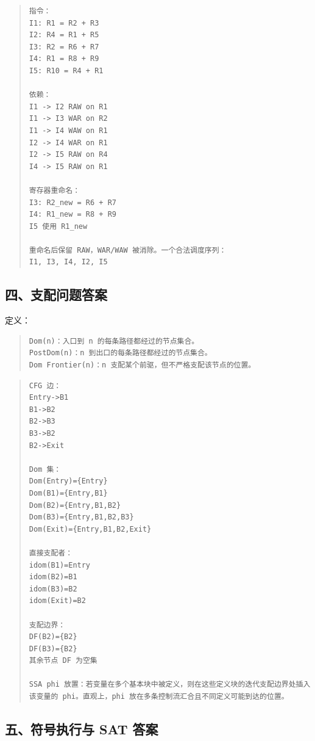 \documentclass[UTF8,zihao=-4]{ctexart}
\begin{document}
\begin{quote}
\footnotesize
\begin{verbatim}
指令：
I1: R1 = R2 + R3
I2: R4 = R1 + R5
I3: R2 = R6 + R7
I4: R1 = R8 + R9
I5: R10 = R4 + R1

依赖：
I1 -> I2 RAW on R1
I1 -> I3 WAR on R2
I1 -> I4 WAW on R1
I2 -> I4 WAR on R1
I2 -> I5 RAW on R4
I4 -> I5 RAW on R1

寄存器重命名：
I3: R2_new = R6 + R7
I4: R1_new = R8 + R9
I5 使用 R1_new

重命名后保留 RAW，WAR/WAW 被消除。一个合法调度序列：
I1, I3, I4, I2, I5
\end{verbatim}
\end{quote}



\subsection{四、支配问题答案}


定义：


\begin{quote}
\footnotesize
\begin{verbatim}
Dom(n)：入口到 n 的每条路径都经过的节点集合。
PostDom(n)：n 到出口的每条路径都经过的节点集合。
Dom Frontier(n)：n 支配某个前驱，但不严格支配该节点的位置。
\end{verbatim}
\end{quote}


\begin{quote}
\footnotesize
\begin{verbatim}
CFG 边：
Entry->B1
B1->B2
B2->B3
B3->B2
B2->Exit

Dom 集：
Dom(Entry)={Entry}
Dom(B1)={Entry,B1}
Dom(B2)={Entry,B1,B2}
Dom(B3)={Entry,B1,B2,B3}
Dom(Exit)={Entry,B1,B2,Exit}

直接支配者：
idom(B1)=Entry
idom(B2)=B1
idom(B3)=B2
idom(Exit)=B2

支配边界：
DF(B2)={B2}
DF(B3)={B2}
其余节点 DF 为空集

SSA phi 放置：若变量在多个基本块中被定义，则在这些定义块的迭代支配边界处插入该变量的 phi。直观上，phi 放在多条控制流汇合且不同定义可能到达的位置。
\end{verbatim}
\end{quote}



\subsection{五、符号执行与 SAT 答案}
\end{document}
